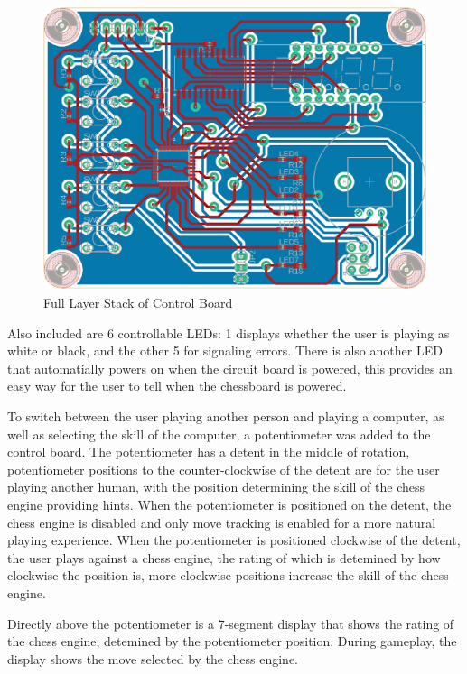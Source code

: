 \documentclass[journal]{IEEEtran}
\begin{document}
\begin{figure}[!ht]
	\centering
	\includegraphics[width=\linewidth]{Images/ControlBoardDesign.png}
	\caption{Full Layer Stack of Control Board}
	\label{PCB}
\end{figure}

Also included are 6 controllable LEDs: 1 displays whether the user is playing as white or black, and the other 5 for signaling errors.
There is also another LED that automatially powers on when the circuit board is powered, this provides an easy way for the user to tell when the chessboard is powered.

To switch between the user playing another person and playing a computer, as well as selecting the skill of the computer, a potentiometer was added to the control board. The potentiometer has a detent in the middle of rotation, potentiometer positions to the counter-clockwise of the detent are for the user playing another human, with the position determining the skill of the chess engine providing hints. When the potentiometer is positioned on the detent, the chess engine is disabled and only move tracking is enabled for a more natural playing experience. When the potentiometer is positioned clockwise of the detent, the user plays against a chess engine, the rating of which is detemined by how clockwise the position is, more clockwise positions increase the skill of the chess engine.

Directly above the potentiometer is a 7-segment display that shows the rating of the chess engine, detemined by the potentiometer position. During gameplay, the display shows the move selected by the chess engine.
\end{document}
